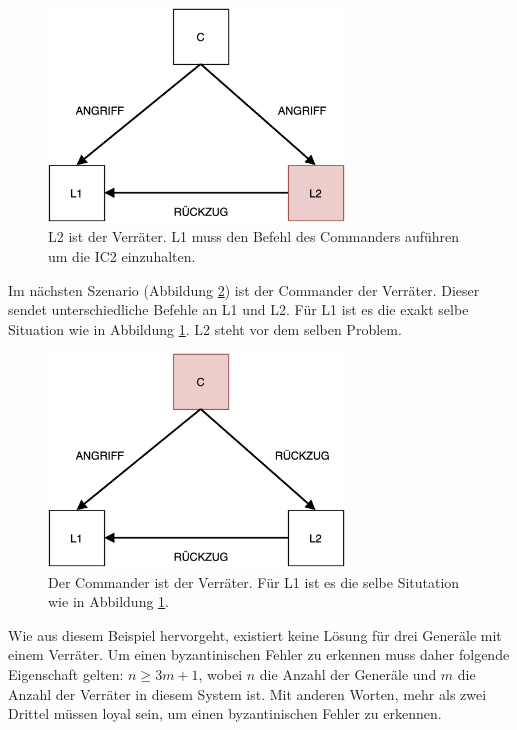 \documentclass{article}
\begin{document}
\begin{figure}[H]
    \centering
    \includegraphics[width=0.7\textwidth]{general1.png}
    \caption{L2 ist der Verräter. L1 muss den Befehl des Commanders auführen um die IC2 einzuhalten.}
    \label{fig:general1}
\end{figure}

Im nächsten Szenario (Abbildung \ref{fig:general2}) ist der Commander der Verräter. Dieser sendet unterschiedliche 
Befehle an L1 und L2. Für L1 ist es die exakt selbe Situation 
wie in Abbildung \ref{fig:general1}. L2 steht vor dem selben Problem. 

\begin{figure}[H]
    \centering
    \includegraphics[width=0.7\textwidth]{general2.png}
    \caption{Der Commander ist der Verräter. Für L1 ist es die selbe Situtation wie in Abbildung \ref{fig:general1}.}
    \label{fig:general2}
\end{figure}

Wie aus diesem Beispiel hervorgeht, existiert keine Lösung für drei Generäle mit einem Verräter. 
Um einen byzantinischen Fehler zu erkennen muss daher folgende Eigenschaft gelten: $n \geq 3m + 1$, 
wobei $n$ die Anzahl der Generäle und $m$ die Anzahl der Verräter in diesem System ist. Mit anderen Worten, 
mehr als zwei Drittel müssen loyal sein, um einen byzantinischen Fehler zu erkennen. 
\end{document}
